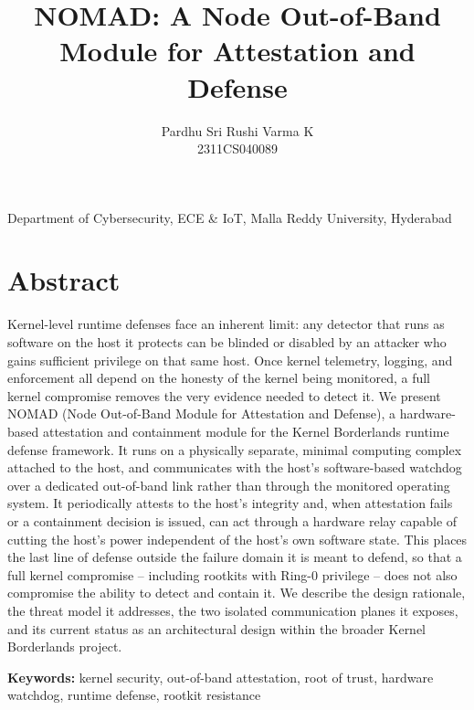 \documentclass[11pt]{article}
\title{\textbf{NOMAD: A Node Out-of-Band Module for Attestation and Defense}}
\author{Pardhu Sri Rushi Varma K \\ \small 2311CS040089}
\date{}
\begin{document}
\pagestyle{empty}

\makeatletter
\begin{center}
{\LARGE\bfseries \@title \par}
\end{center}
\makeatother
\vspace{-1em}

\begin{center}
\small Department of Cybersecurity, ECE \& IoT, Malla Reddy University, Hyderabad
\end{center}

\vspace{0.5em}

\section*{Abstract}

Kernel-level runtime defenses face an inherent limit: any detector that runs
as software on the host it protects can be blinded or disabled by an
attacker who gains sufficient privilege on that same host. Once kernel
telemetry, logging, and enforcement all depend on the honesty of the kernel
being monitored, a full kernel compromise removes the very evidence needed
to detect it. We present NOMAD (Node Out-of-Band Module for Attestation and
Defense), a hardware-based attestation and containment module for the
Kernel Borderlands runtime defense framework. It runs on a physically
separate, minimal computing complex attached to the host, and communicates
with the host's software-based watchdog over a dedicated out-of-band link
rather than through the monitored operating system. It periodically attests
to the host's integrity and, when attestation fails or a containment
decision is issued, can act through a hardware relay capable of cutting the
host's power independent of the host's own software state. This places the
last line of defense outside the failure domain it is meant to defend,
so that a full kernel compromise -- including rootkits with Ring-0
privilege -- does not also compromise the ability to detect and contain it.
We describe the design rationale, the threat model it addresses,
the two isolated communication planes it exposes, and its current status
as an architectural design within the broader Kernel Borderlands project.

\vspace{0.7em}
\noindent\textbf{Keywords:} kernel security, out-of-band attestation, root
of trust, hardware watchdog, runtime defense, rootkit resistance
\end{document}
